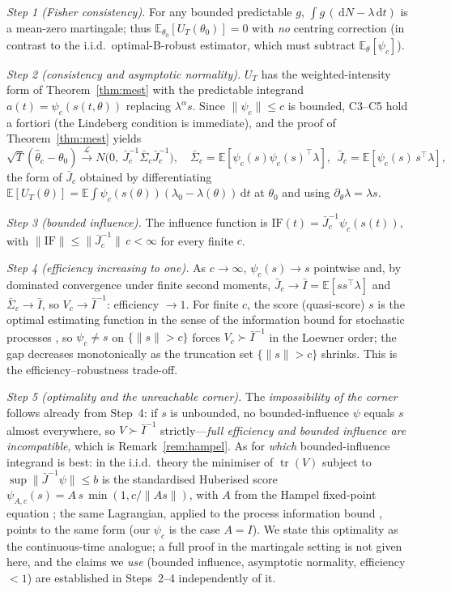 \documentclass[11pt]{article}
\newcommand{\dd}{\,\mathrm{d}}
\newcommand{\E}{\mathbb{E}}
\newcommand{\toL}{\xrightarrow{\mathcal{L}}}
\begin{document}
\emph{Step 1 (Fisher consistency).} For any bounded predictable $g$, $\int g\,(\dd N-\lambda\dd t)$
is a mean-zero martingale; thus $\E_{\theta_0}[U_T(\theta_0)]=0$ with \emph{no}
centring correction (in contrast to the i.i.d.\ optimal-B-robust estimator, which
must subtract $\E_\theta[\psi_c]$).

\emph{Step 2 (consistency and asymptotic normality).} $U_T$ has the weighted-intensity
form of Theorem~\ref{thm:mest} with the predictable integrand $a(t)=\psi_c(s(t,\theta))$
replacing $\lambda^\alpha s$. Since $\|\psi_c\|\le c$ is bounded, C3--C5 hold a
fortiori (the Lindeberg condition is immediate), and the proof of
Theorem~\ref{thm:mest} yields
\[
\sqrt T(\hat\theta_c-\theta_0)\toL N\!\big(0,\ \bar J_c^{-1}\bar\Sigma_c\bar J_c^{-1}\big),
\quad
\bar\Sigma_c=\E[\psi_c(s)\psi_c(s)^\top\lambda],\ \
\bar J_c=\E[\psi_c(s)\,s^\top\lambda],
\]
the form of $\bar J_c$ obtained by differentiating
$\E[U_T(\theta)]=\E\!\int\psi_c(s(\theta))(\lambda_0-\lambda(\theta))\dd t$ at $\theta_0$
and using $\partial_\theta\lambda=\lambda s$.

\emph{Step 3 (bounded influence).} The influence function is
$\mathrm{IF}(t)=\bar J_c^{-1}\psi_c(s(t))$, with $\|\mathrm{IF}\|\le\|\bar J_c^{-1}\|\,c<\infty$
for every finite $c$.

\emph{Step 4 (efficiency increasing to one).} As $c\to\infty$, $\psi_c(s)\to s$
pointwise and, by dominated convergence under finite second moments,
$\bar J_c\to\bar I=\E[ss^\top\lambda]$ and $\bar\Sigma_c\to\bar I$, so
$V_c\to\bar I^{-1}$: efficiency $\to1$. For finite $c$, the score (quasi-score) $s$ is
the optimal estimating function in the sense of the information bound for stochastic
processes \citep[i.i.d.\ bound]{godambe1960}\citep[process/martingale
version]{godambe1985,heyde1997}, so $\psi_c\neq s$ on $\{\|s\|>c\}$ forces
$V_c\succ\bar I^{-1}$ in the Loewner order; the gap decreases monotonically as the
truncation set $\{\|s\|>c\}$ shrinks. This is the efficiency--robustness trade-off.

\emph{Step 5 (optimality and the unreachable corner).} The \emph{impossibility of the
corner} follows already from Step~4: if $s$ is unbounded, no bounded-influence $\psi$
equals $s$ almost everywhere, so $V\succ\bar I^{-1}$ strictly---\emph{full efficiency
and bounded influence are incompatible}, which is Remark~\ref{rem:hampel}. As for
\emph{which} bounded-influence integrand is best: in the i.i.d.\ theory the minimiser
of $\operatorname{tr}(V)$ subject to $\sup\|\bar J^{-1}\psi\|\le b$ is the standardised
Huberised score $\psi_{A,c}(s)=A\,s\,\min(1,c/\|As\|)$, with $A$ from the Hampel
fixed-point equation \citep[Thm.~2.6]{hampel1986}; the same Lagrangian, applied to the
process information bound \citep{godambe1985,heyde1997}, points to the same form (our
$\psi_c$ is the case $A=I$). We state this optimality as the continuous-time analogue;
a full proof in the martingale setting is not given here, and the claims we \emph{use}
(bounded influence, asymptotic normality, efficiency $<1$) are established in
Steps~2--4 independently of it.
\end{document}
